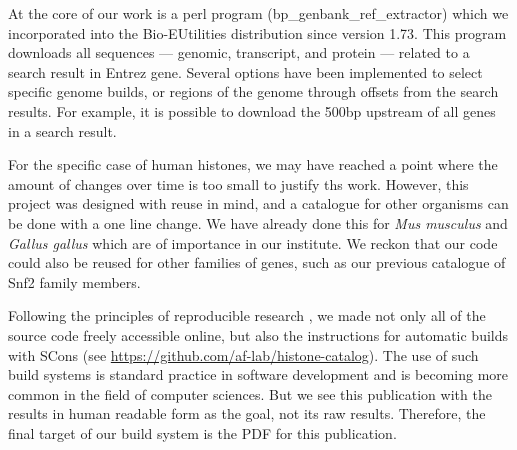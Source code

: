   At the core of our work is a perl program (bp\_genbank\_ref\_extractor) which
  we incorporated into the Bio-EUtilities distribution since version 1.73. This program
  downloads all sequences --- genomic, transcript, and protein --- related to a search
  result in Entrez gene. Several options have been implemented to select specific genome
  builds, or regions of the genome through offsets from the search results. For example,
  it is possible to download the 500bp upstream of all genes in a search result.


  For the specific case of human histones, we may have reached a point where the amount
  of changes over time is too small to justify ths work. However, this project was
  designed with reuse in mind, and a catalogue for other organisms can be done with a
  one line change. We have already done this for \textit{Mus musculus} and
  \textit{Gallus gallus} which are of importance in our institute.
  We reckon that our code could also be reused for other families of genes, such as our
  previous catalogue of Snf2 family members\citep{andrew-snf2-catalogue}.

  Following the principles of reproducible research
  \citep{reproducible-research-bioinformatics, reproducible-research-law}, we made
  not only all of the source code freely accessible online, but also the instructions
  for automatic builds with SCons\citep{SCons2005}
  (see \url{https://github.com/af-lab/histone-catalog}). The use of such build systems is
  standard practice in software development and is becoming more common in the field
  of computer sciences. But we see this publication with the results in human readable
  form as the goal, not its raw results. Therefore, the final target of our build system is
  the PDF for this publication.




